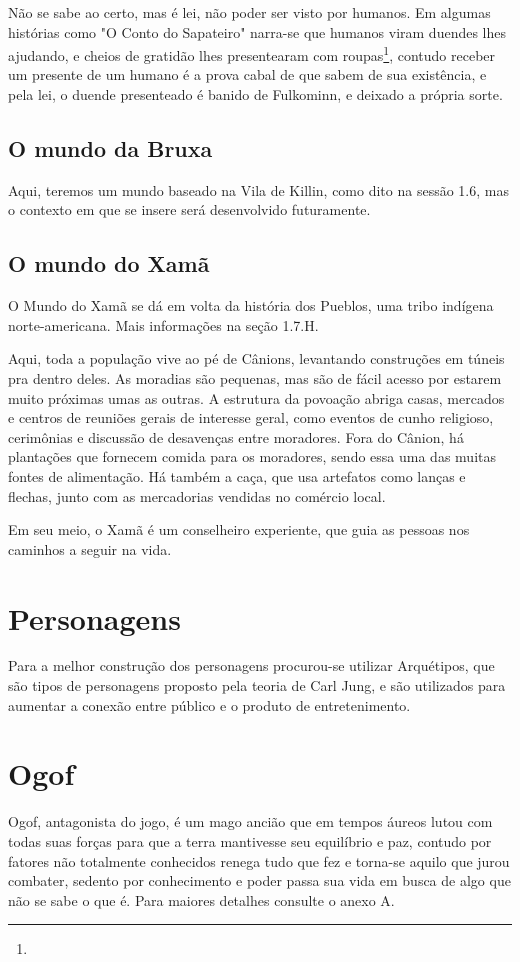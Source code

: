 Não se sabe ao certo, mas é lei, não poder ser visto por humanos. Em algumas histórias como "O Conto do Sapateiro" narra-se que humanos viram duendes lhes ajudando, e cheios de gratidão lhes presentearam com roupas\footnote{}, contudo receber um presente de um humano é a prova cabal de que sabem de sua existência, e pela lei, o duende presenteado é banido de Fulkominn, e deixado a própria sorte.

\subsection{O mundo da Bruxa}
Aqui, teremos um mundo baseado na Vila de Killin, como dito na sessão 1.6, mas o contexto em que se insere será desenvolvido futuramente.


\subsection{O mundo do Xamã}
O Mundo do Xamã se dá em volta da história dos Pueblos, uma tribo indígena norte-americana. Mais informações na seção 1.7.H.

Aqui, toda a população vive ao pé de Cânions, levantando construções em túneis pra dentro deles. As moradias são pequenas, mas são de fácil acesso por estarem muito próximas umas as outras. A estrutura da povoação abriga casas, mercados e centros de reuniões gerais de interesse geral, como eventos de cunho religioso, cerimônias e discussão de desavenças entre moradores. Fora do Cânion, há plantações que fornecem comida para os moradores, sendo essa uma das muitas fontes de alimentação. Há também a caça, que usa artefatos como lanças e flechas, junto com as mercadorias vendidas no comércio local.

Em seu meio, o Xamã é um conselheiro experiente, que guia as pessoas nos caminhos a seguir na vida.

\section{Personagens}
Para a melhor construção dos personagens procurou-se utilizar Arquétipos, que são tipos de personagens proposto pela teoria de Carl Jung, e são utilizados para aumentar a conexão entre público e o produto de entretenimento.

\section{Ogof}
Ogof, antagonista do jogo, é um mago ancião que em tempos áureos lutou com todas suas forças para que a terra mantivesse seu equilíbrio e paz, contudo por fatores não totalmente conhecidos renega tudo que fez e torna-se aquilo que jurou combater, sedento por conhecimento e poder passa sua vida em busca de algo que não se sabe o que é. Para maiores detalhes consulte o anexo A.

